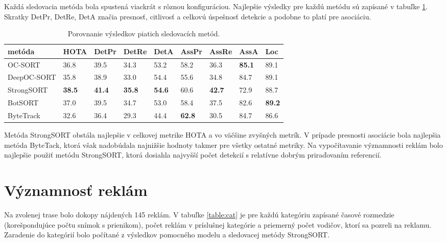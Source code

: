 Každá sledovacia metóda bola spustená viackrát s rôznou konfiguráciou. Najlepšie výsledky pre každú metódu sú zapísané v tabuľke \ref{table:hota1}. Skratky DetPr, DetRe, DetA značia presnosť, citlivosť a celkovú úspešnosť detekcie a podobne to platí pre asociáciu.
\\
\begin{table}[ht]
\centering
\begin{tabular}{|l l l l l l l l l|}
 \hline
metóda & HOTA & DetPr & DetRe & DetA & AssPr & AssRe & AssA & Loc \\ [0.5ex]
 \hline
OC-SORT & 36.8  &  39.5  &  34.3  &  53.2  &   58.2  &  36.3   &  \textbf{85.1}  &  89.1 \\ [0.1ex]
DeepOC-SORT & 35.8 &   38.9  &  33.0  &  54.4  &  55.6  &  34.8  &  84.7  &  89.1 \\ [0.1ex]
StrongSORT & \textbf{38.5}  &  \textbf{41.4}  &  \textbf{35.8}  &  \textbf{54.6} &   60.6   &   \textbf{42.7}   & 72.9   & 88.7 \\ [0.1ex]
BotSORT & 37.0  &  39.5  &  34.7  &  53.0  &  58.4  &  37.5 &   82.6  &  \textbf{89.2} \\ [0.1ex]
ByteTrack & 32.6  &  36.4  &  29.3  &  44.4  &  \textbf{62.8}  &  30.5  &  84.7  &  86.6 \\ [0.1ex]
 \hline
\end{tabular}
\caption{Porovnanie výsledkov piatich sledovacích metód.}
\label{table:hota1}
\end{table}

Metóda StrongSORT obstála najlepšie v celkovej metrike HOTA a vo väčšine zvyšných metrík. V prípade presnosti asociácie bola najlepšia metóda ByteTack, ktorá však nadobúdala najnižšie hodnoty takmer pre všetky ostatné metriky. Na vypočítavanie významnosti reklám bolo najlepšie použiť metódu StrongSORT, ktorá dosiahla najvyšší počet detekcií s relatívne dobrým priraďovaním referencií.

\section{Významnosť reklám}

Na zvolenej trase bolo dokopy nájdených 145 reklám. V tabuľke \ref{table:cat} je pre každú kategóriu zapísané časové rozmedzie (korešpondujúce počtu snímok s prienikom), počet reklám v príslušnej kategórie a priemerný počet vodičov, ktorí sa pozreli na reklamu. Zaradenie do kategórií bolo počítané z výsledkov pomocného modelu a sledovacej metódy StrongSORT.

